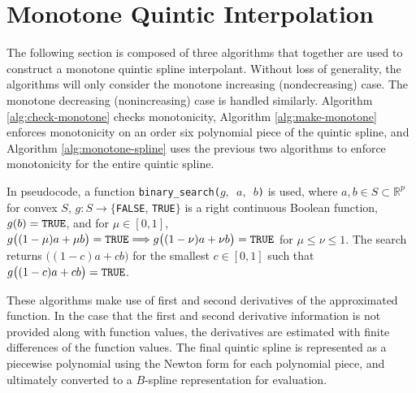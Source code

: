 \documentclass{scspaperproc}
\theoremstyle{scsthe}
\begin{document}
\section{Monotone Quintic Interpolation}
\label{sec:monotone-quintic}

The following section is composed of three algorithms that together are used to construct a monotone quintic spline interpolant. Without loss of generality, the algorithms will only consider the monotone increasing (nondecreasing) case. The monotone decreasing (nonincreasing) case is handled similarly. Algorithm \ref{alg:check-monotone} checks monotonicity,
Algorithm \ref{alg:make-monotone} enforces monotonicity on an order six
polynomial piece of the quintic spline, and Algorithm
\ref{alg:monotone-spline} uses the previous two algorithms to enforce
monotonicity for the entire quintic spline.


In pseudocode, a function \texttt{binary\_search($g,$ $a,$ $b$)} is used, where $a,b\in S\subset \mathbb{R}^p$ for convex $S$, $g: S \rightarrow \{$\texttt{FALSE}, \texttt{TRUE}$\}$ is a right continuous Boolean function, $g(b) = \hbox{\texttt{TRUE}}$, and for $\mu \in [0,1]$, $g\big((1-\mu)a + \mu b\big) =\hbox{\texttt{TRUE}} \Longrightarrow g\big((1-\nu)a + \nu b\big) =\hbox{\texttt{TRUE}}$ for $\mu \le \nu\le1$. The search returns $\big((1-c)a + c b\big)$ for the smallest $c \in [0,1]$ such that $g\big((1-c)a + c b\big) = \hbox{\texttt{TRUE}}$.

These algorithms make use of first and second derivatives of the approximated function. In the case that the first and second derivative information is not provided along with function values, the derivatives are estimated with finite differences of the function values. The final quintic spline is represented as a piecewise polynomial using the Newton form for each polynomial piece, and ultimately converted to a $B$-spline representation for evaluation.
\end{document}
